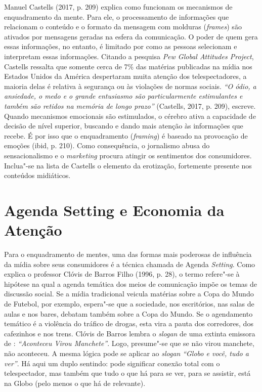 Manuel Castells (2017, p. 209) explica como funcionam os mecanismos de
enquadramento da mente. Para ele, o processamento de informações que
relacionam o conteúdo e o formato da mensagem com molduras
(\emph{frames}) são ativados por mensagens geradas na esfera da
comunicação. O poder de quem gera essas informações, no entanto, é
limitado por como as pessoas selecionam e interpretam essas informações.
Citando a pesquisa \emph{Pew Global Attitudes Project}, Castells
ressalta que somente cerca de 7\% das matérias publicadas na mídia nos
Estados Unidos da América despertaram muita atenção dos telespectadores,
a maioria delas é relativa à segurança ou às violações de normas
sociais. \emph{``O ódio, a ansiedade, o medo e o grande entusiasmo são
particularmente estimulantes e também são retidos na memória de longo
prazo''} (Castells, 2017, p. 209), escreve. Quando mecanismos emocionais
são estimulados, o cérebro ativa a capacidade de decisão de nível
superior, buscando e dando mais atenção às informações que recebe. É por
isso que o enquadramento (\emph{framing}) é baseado na provocação de
emoções (ibid, p. 210). Como consequência, o jornalismo abusa do
sensacionalismo e o \emph{marketing} procura atingir os sentimentos dos
consumidores. Inclua"-se na lista de Castells o elemento da erotização,
fortemente presente nos conteúdos midiáticos.

\section{Agenda Setting e Economia da Atenção}

Para o enquadramento de mentes, uma das formas mais poderosas de
influência da mídia sobre seus consumidores é a técnica chamada de
Agenda \emph{Setting}. Como explica o professor Clóvis de Barros Filho
(1996, p. 28), o termo refere"-se à hipótese na qual a agenda temática
dos meios de comunicação impõe os temas de discussão social. Se a mídia
tradicional veicula matérias sobre a Copa do Mundo de Futebol, por
exemplo, espera"-se que a sociedade, nos escritórios, nas salas de aulas
e nos bares, debatam também sobre a Copa do Mundo. Se o agendamento
temático é a violência do tráfico de drogas, esta vira a pauta dos
corredores, dos cafezinhos e nos trens. Clóvis de Barros lembra o
\emph{slogan} de uma extinta emissora de : \emph{``Aconteceu Virou
Manchete''}. Logo, presume"-se que se não virou manchete, não aconteceu.
A mesma lógica pode se aplicar ao \emph{slogan} \emph{``Globo e você,
tudo a ver''}. Há aqui um duplo sentindo: pode significar conexão total
com o telespectador, mas também que tudo o que há para se ver, para se
assistir, está na Globo (pelo menos o que há de relevante).

